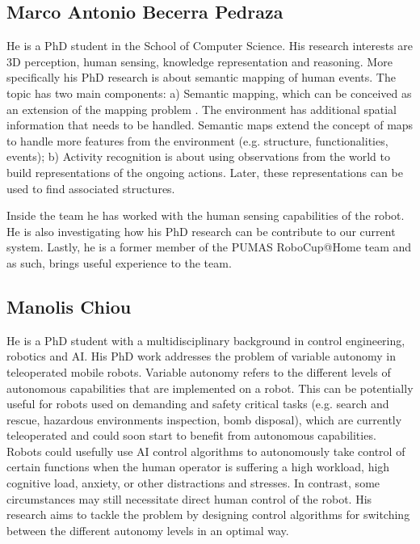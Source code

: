 \subsection{Marco Antonio Becerra Pedraza}

He is a PhD student in the School of Computer Science. His research interests are 3D perception, human sensing, knowledge representation and reasoning. More specifically his PhD research is about semantic mapping of human events. The topic has two main components: a) Semantic mapping, which can be conceived as an extension of the mapping problem \cite{Nuchter08_TowardsSemanticMaps}. The environment has additional spatial information that needs to be handled. Semantic maps extend the concept of maps to handle more features from the environment (e.g. structure, functionalities, events); b) Activity recognition is about using observations from the world to build representations of the ongoing actions. Later, these representations can be used to find associated structures.

Inside the team he has worked with the human sensing capabilities of the robot. He is also investigating how his PhD research can be contribute to our current system. Lastly, he is a former member of the PUMAS RoboCup@Home team and as such, brings useful experience to the team.

\subsection{Manolis Chiou}

He is a PhD student with a multidisciplinary background in control engineering, robotics and AI. His PhD work addresses the problem of variable autonomy in teleoperated mobile robots. Variable autonomy refers to the different levels of autonomous capabilities that are implemented on a robot. This can be potentially useful for robots used on demanding and safety critical tasks (e.g. search and rescue, hazardous environments inspection, bomb disposal), which are currently teleoperated and could soon start to benefit from autonomous capabilities. Robots could usefully use AI control algorithms to autonomously take control of certain functions when the human operator is suffering a high workload, high cognitive load, anxiety, or other distractions and stresses. In contrast, some circumstances may still necessitate direct human control of the robot. His research aims to tackle the problem by designing control algorithms for switching between the different autonomy levels in an optimal way. 

